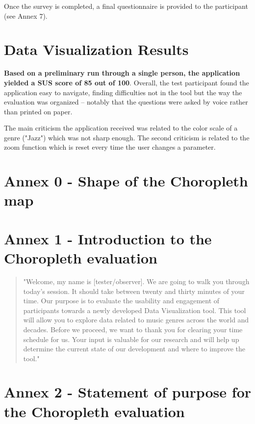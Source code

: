\documentclass[twocolumn, letterpaper,13pt]{scrartcl}
\begin{document}
    Once the survey is completed, a final questionnaire is provided to the participant (see Annex 7).

    \section*{Data Visualization Results}
    
    \textbf{Based on a preliminary run through a single person, the application yielded a SUS score of 85 out of 100}. Overall, the test participant found the application easy to navigate, finding difficulties not in the tool but the way the evaluation was organized -- notably that the questions were asked by voice rather than printed on paper.
    
    The main criticism the application received was related to the color scale of a genre ("Jazz") which was not sharp enough. The second criticism is related to the zoom function which is reset every time the user changes a parameter.  
    
    \section*{Annex 0 - Shape of the Choropleth map}

    \section*{Annex 1 - Introduction to the Choropleth evaluation}
    
    \begin{quote}
        "Welcome, my name is [tester/observer]. We are going to walk you through today's session. It should take between twenty and thirty minutes of your time. Our purpose is to evaluate the usability and engagement of participants towards a newly developed Data Visualization tool. This tool will allow you to explore data related to music genres across the world and decades.
        \newline\newline
        Before we proceed, we want to thank you for clearing your time schedule for us. Your input is valuable for our research and will help up determine the current state of our development and where to improve the tool."
    \end{quote}
    
    \section*{Annex 2 - Statement of purpose for the Choropleth evaluation}
    
\end{document}
